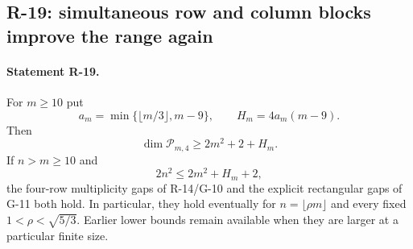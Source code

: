 \subsection{R-19: simultaneous row and column blocks improve the range again}

\paragraph{Statement R-19.}
For $m\geq10$ put
\[
 a_m=\min\{\lfloor m/3\rfloor,m-9\},\qquad
 H_m=4a_m(m-9).
\]
Then
\begin{equation}\label{R19:dimension}
 \dim\mathcal P_{m,4}\geq2m^2+2+H_m.
\end{equation}
If $n>m\geq10$ and
\begin{equation}\label{R19:padding}
 2n^2\leq2m^2+H_m+2,
\end{equation}
the four-row multiplicity gaps of R-14/G-10 and the explicit
rectangular gaps of G-11 both hold. In particular, they hold
eventually for $n=\lfloor\rho m\rfloor$ and every fixed
$1<\rho<\sqrt{5/3}$. Earlier lower bounds remain available
when they are larger at a particular finite size.


